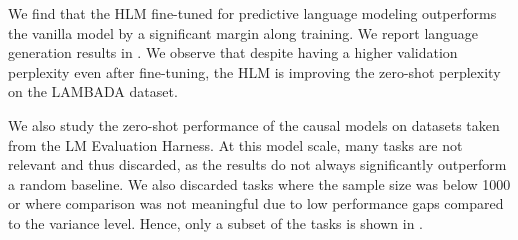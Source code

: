 \begin{table}
\centering
{}
\caption{Results of the causal language models on the validation set after training, and on the LAMBADA dataset.}
\label{tab:lm_results}
\end{table}

We find that the HLM fine-tuned for predictive language modeling outperforms the vanilla model by a significant margin along training. We report language generation results in . We observe that despite having a higher validation perplexity even after fine-tuning, the HLM is improving the zero-shot perplexity on the LAMBADA dataset.

We also study the zero-shot performance of the causal models on datasets taken from the LM Evaluation Harness. At this model scale, many tasks are not relevant and thus discarded, as the results do not always significantly outperform a random baseline. We also discarded tasks where the sample size was below 1000 or where comparison was not meaningful due to low performance gaps compared to the variance level. %
Hence, only a subset of the tasks is shown in
.


